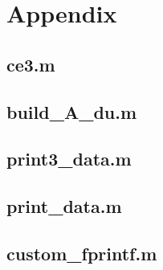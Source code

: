 \documentclass{article}
\begin{document}
\section{Appendix}

\subsection{ce3.m}

\subsection{build\_A\_du.m}

\subsection{print3\_data.m}

\subsection{print\_data.m}

\subsection{custom\_fprintf.m}

\end{document}
